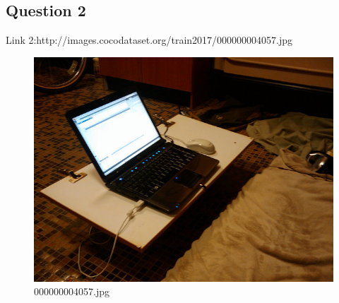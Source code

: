 \subsection{Question 2}
Link 2:http://images.cocodataset.org/train2017/000000004057.jpg
    \begin{figure}[h]
        \centering
        \includegraphics[width=0.8\linewidth]{../image set/easy/000000004057.jpg}
        \caption{000000004057.jpg}
    \end{figure}
